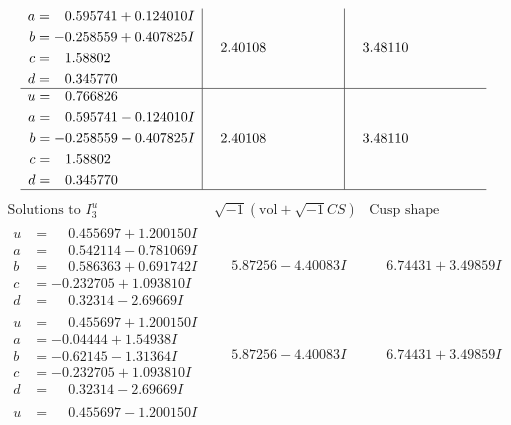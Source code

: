 \documentclass[1p]{elsarticle_modified}
\theoremstyle{definition}
\newcommand{\I}{\sqrt{-1}}
\begin{document}
$$\begin{array}{c|c|c}
\begin{aligned}
a &= \phantom{-}0.595741 + 0.124010 I \\
b &= -0.258559 + 0.407825 I \\
c &= \phantom{-}1.58802\phantom{ +0.000000I} \\
d &= \phantom{-}0.345770\phantom{ +0.000000I}\end{aligned}
 & \phantom{-}2.40108\phantom{ +0.000000I} & \phantom{-}3.48110\phantom{ +0.000000I} \\ \hline\begin{aligned}
u &= \phantom{-}0.766826\phantom{ +0.000000I} \\
a &= \phantom{-}0.595741 - 0.124010 I \\
b &= -0.258559 - 0.407825 I \\
c &= \phantom{-}1.58802\phantom{ +0.000000I} \\
d &= \phantom{-}0.345770\phantom{ +0.000000I}\end{aligned}
 & \phantom{-}2.40108\phantom{ +0.000000I} & \phantom{-}3.48110\phantom{ +0.000000I}\\
 \hline 
 \end{array}$$\newpage$$\begin{array}{c|c|c}  
\text{Solutions to }I^u_{3}& \I (\text{vol} + \sqrt{-1}CS) & \text{Cusp shape}\\
 \hline 
\begin{aligned}
u &= \phantom{-}0.455697 + 1.200150 I \\
a &= \phantom{-}0.542114 - 0.781069 I \\
b &= \phantom{-}0.586363 + 0.691742 I \\
c &= -0.232705 + 1.093810 I \\
d &= \phantom{-}0.32314 - 2.69669 I\end{aligned}
 & \phantom{-}5.87256 - 4.40083 I & \phantom{-}6.74431 + 3.49859 I \\ \hline\begin{aligned}
u &= \phantom{-}0.455697 + 1.200150 I \\
a &= -0.04444 + 1.54938 I \\
b &= -0.62145 - 1.31364 I \\
c &= -0.232705 + 1.093810 I \\
d &= \phantom{-}0.32314 - 2.69669 I\end{aligned}
 & \phantom{-}5.87256 - 4.40083 I & \phantom{-}6.74431 + 3.49859 I \\ \hline\begin{aligned}
u &= \phantom{-}0.455697 - 1.200150 I \\

\end{aligned}
\end{array}$$
\end{document}
